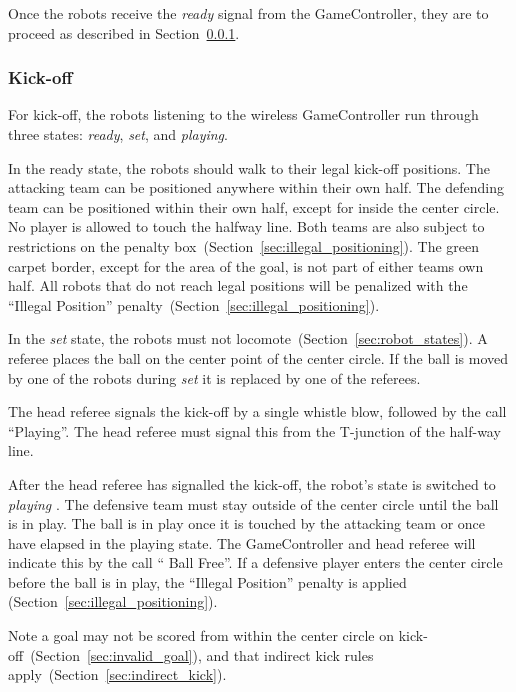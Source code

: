 Once the robots receive the \emph{ready} signal from the GameController, they are to proceed as described in Section~\ref{sec:kick-off}.

\subsubsection{Kick-off}
\label{sec:kick-off}
For kick-off, the robots listening to the wireless GameController run through three states: \emph{ready}, \emph{set}, and \emph{playing}. 

In the ready state, the robots should walk to their legal kick-off positions.
The attacking team can be positioned anywhere within their own half.
The defending team can be positioned within their own half, except for inside the center circle.
No player is allowed to touch the halfway line.
Both teams are also subject to restrictions on the penalty box~(\cf Section~\ref{sec:illegal_positioning}).
The green carpet border, except for the area of the goal, is not part of either teams own half. All robots that do not reach legal positions will be penalized with the ``Illegal Position'' penalty~(\cf Section~\ref{sec:illegal_positioning}).

In the \emph{set} state, the robots must not locomote~(\cf Section~\ref{sec:robot_states}). A referee places the ball on the center point of the center circle. If the ball is moved by one of the robots during \emph{set} it is replaced by one of the referees.


The head referee signals the kick-off by a single whistle blow, followed by the call ``Playing''. The head referee must signal this from the T-junction of the half-way line.

After the head referee has signalled the kick-off, the robot's state is switched to \emph{playing} .
The defensive team must stay outside of the center circle until the ball is in play. The ball is in play once it is touched by the attacking team or once \emph{\KickOffBallFreeTime} have elapsed in the playing state. The GameController and head referee will indicate this by the call `` Ball Free''. If a defensive player enters the center circle before the ball is in play, the ``Illegal Position'' penalty is applied (\cf Section~\ref{sec:illegal_positioning}).

Note a goal may not be scored from within the center circle on kick-off~(\cf Section~\ref{sec:invalid_goal}), and that indirect kick rules apply~(\cf Section~\ref{sec:indirect_kick}).

